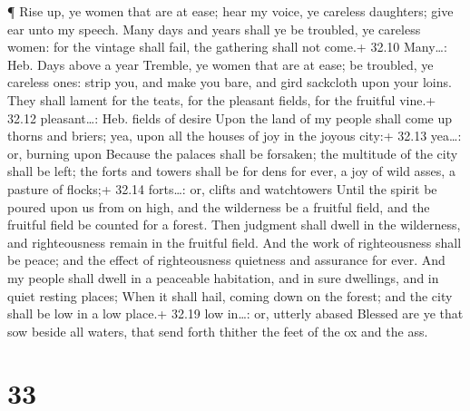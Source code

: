  ¶ Rise up, ye women that are at ease; hear my voice, ye
careless daughters; give ear unto my speech.  Many days and
years shall ye be troubled, ye careless women: for the vintage shall
fail, the gathering shall not come.+ 32.10 Many\ldots: Heb. Days above a
year  Tremble, ye women that are at ease; be troubled, ye
careless ones: strip you, and make you bare, and gird sackcloth upon
your loins.  They shall lament for the teats, for the
pleasant fields, for the fruitful vine.+ 32.12 pleasant\ldots: Heb.
fields of desire  Upon the land of my people shall come up
thorns and briers; yea, upon all the houses of joy in the joyous city:+
32.13 yea\ldots: or, burning upon  Because the palaces
shall be forsaken; the multitude of the city shall be left; the forts
and towers shall be for dens for ever, a joy of wild asses, a pasture of
flocks;+ 32.14 forts\ldots: or, clifts and watchtowers 
Until the spirit be poured upon us from on high, and the wilderness be a
fruitful field, and the fruitful field be counted for a forest.
 Then judgment shall dwell in the wilderness, and
righteousness remain in the fruitful field.  And the work
of righteousness shall be peace; and the effect of righteousness
quietness and assurance for ever.  And my people shall
dwell in a peaceable habitation, and in sure dwellings, and in quiet
resting places;  When it shall hail, coming down on the
forest; and the city shall be low in a low place.+ 32.19 low in\ldots:
or, utterly abased  Blessed are ye that sow beside all
waters, that send forth thither the feet of the ox and the ass.

\hypertarget{section-32}{%
\section{33}\label{section-32}}

